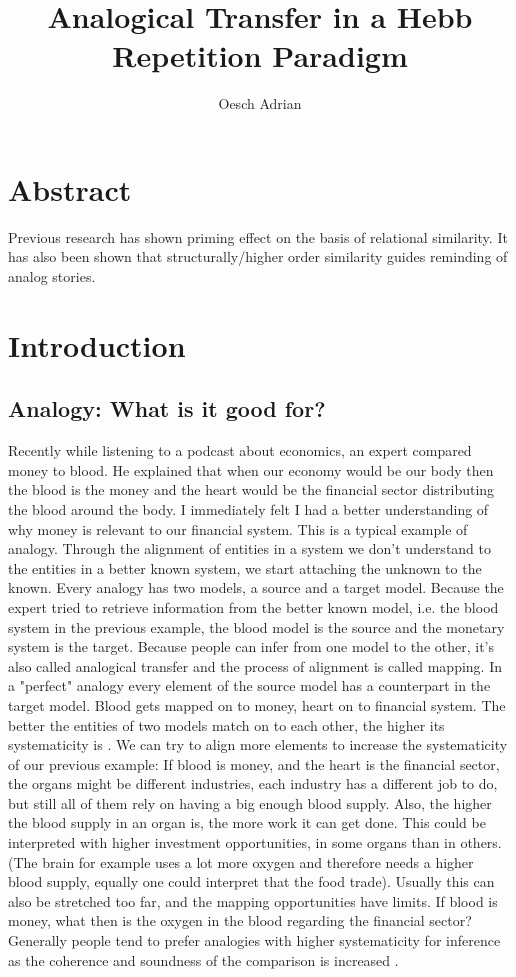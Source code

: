\documentclass[a4paper,man,natbib,floatsintext,import]{apa6}
\title{Analogical Transfer in a Hebb Repetition Paradigm}
\author{Oesch Adrian}
\affiliation{University of Zurich}
\begin{document}

\section*{Abstract}
Previous research has shown priming effect on the basis of relational similarity. It has also been shown that structurally/higher order similarity guides reminding of analog stories.

\newpage
\tableofcontents

\newpage
\section{Introduction}
\subsection{Analogy: What is it good for?}
Recently while listening to a podcast about economics, an expert compared money to blood. He explained that when our economy would be our body then the blood is the money and the heart would be the financial sector distributing the blood around the body. I immediately felt I had a better understanding of why money is relevant to our financial system.
This is a typical example of analogy. Through the alignment of entities in a system we don't understand to the entities in a better known system, we start attaching the unknown to the known. Every analogy has two models, a source and a target model. Because the expert tried to retrieve information from the better known model, i.e. the blood system in the previous example, the blood model is the source and the monetary system is the target. Because people can infer from one model to the other, it's also called analogical transfer and the process of alignment is called mapping. In a "perfect" analogy every element of the source model has a counterpart in the target model. Blood gets mapped on to money, heart on to financial system. The better the entities of two models match on to each other, the higher its systematicity is \citep{Gentner1997}. We can try to align more elements to increase the systematicity of our previous example: If blood is money, and the heart is the financial sector, the organs might be different industries, each industry has a different job to do, but still all of them rely on having a big enough blood supply. Also, the higher the blood supply in an organ is, the more work it can get done. This could be interpreted with higher investment opportunities, in some organs than in others. (The brain for example uses a lot more oxygen and therefore needs a higher blood supply, equally one could interpret that the food trade). Usually this can also be stretched too far, and the mapping opportunities have limits. If blood is money, what then is the oxygen in the blood regarding the financial sector? Generally people tend to prefer analogies with higher systematicity for inference as the coherence and soundness of the comparison is increased \citep{Clement1991}.
\end{document}
